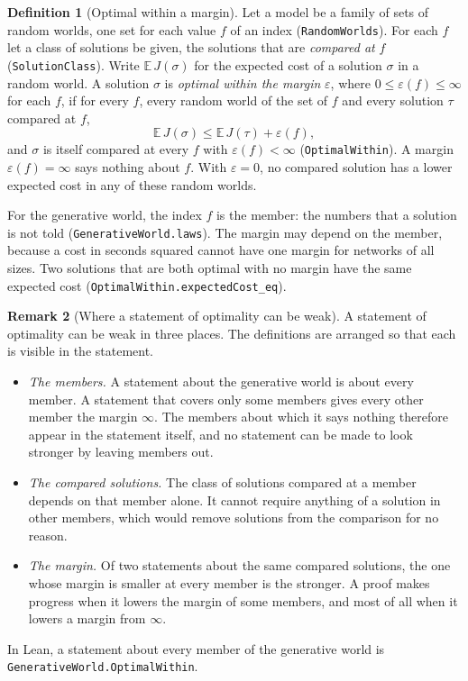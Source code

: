 \documentclass[11pt,a4paper]{article}
\newcommand{\lean}[1]{\texttt{#1}}
\theoremstyle{definition}
\newtheorem{definition}{Definition}[section]
\newtheorem{remark}[definition]{Remark}
\begin{document}
\begin{definition}[Optimal within a margin]
Let a model be a family of sets of random worlds, one set for each value $f$
of an index (\lean{RandomWorlds}). For each $f$ let a class of solutions be
given, the solutions that are \emph{compared at} $f$
(\lean{SolutionClass}). Write $\mathbb{E}\,J(\sigma)$ for the expected cost
of a solution $\sigma$ in a random world. A solution $\sigma$ is
\emph{optimal within the margin} $\varepsilon$, where
$0 \le \varepsilon(f) \le \infty$ for each $f$, if for every $f$, every
random world of the set of $f$ and every solution $\tau$ compared at $f$,
\[
  \mathbb{E}\,J(\sigma) \le \mathbb{E}\,J(\tau) + \varepsilon(f),
\]
and $\sigma$ is itself compared at every $f$ with $\varepsilon(f) < \infty$
(\lean{OptimalWithin}). A margin $\varepsilon(f) = \infty$ says nothing
about $f$. With $\varepsilon = 0$, no compared solution has a lower expected
cost in any of these random worlds.
\end{definition}

For the generative world, the index $f$ is the member: the numbers that a
solution is not told (\lean{GenerativeWorld.\allowbreak laws}). The margin may
depend on the member, because a cost in seconds squared cannot have one
margin for networks of all sizes. Two solutions that are both optimal with
no margin have the same expected cost
(\lean{OptimalWithin.\allowbreak expectedCost\_eq}).

\begin{remark}[Where a statement of optimality can be weak]
A statement of optimality can be weak in three places. The definitions are
arranged so that each is visible in the statement.
\begin{itemize}
\item \emph{The members.} A statement about the generative world is about
  every member. A statement that covers only some members gives every other
  member the margin $\infty$. The members about which it says nothing
  therefore appear in the statement itself, and no statement can be made to
  look stronger by leaving members out.
\item \emph{The compared solutions.} The class of solutions compared at a
  member depends on that member alone. It cannot require anything of a
  solution in other members, which would remove solutions from the
  comparison for no reason.
\item \emph{The margin.} Of two statements about the same compared
  solutions, the one whose margin is smaller at every member is the
  stronger. A proof makes progress when it lowers the margin of some
  members, and most of all when it lowers a margin from $\infty$.
\end{itemize}
In Lean, a statement about every member of the generative world is
\lean{GenerativeWorld.\allowbreak OptimalWithin}.
\end{remark}
\end{document}
